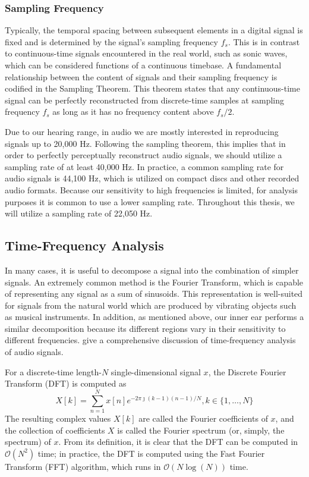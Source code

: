 \subsubsection{Sampling Frequency}

Typically, the temporal spacing between subsequent elements in a digital signal is fixed and is determined by the signal's sampling frequency $f_s$.
This is in contrast to continuous-time signals encountered in the real world, such as sonic waves, which can be considered functions of a continuous timebase.
A fundamental relationship between the content of signals and their sampling frequency is codified in the Sampling Theorem.
This theorem states that any continuous-time signal can be perfectly reconstructed from discrete-time samples at sampling frequency $f_s$ as long as it has no frequency content above $f_s/2$.

Due to our hearing range, in audio we are mostly interested in reproducing signals up to 20,000 Hz.
Following the sampling theorem, this implies that in order to perfectly perceptually reconstruct audio signals, we should utilize a sampling rate of at least 40,000 Hz.
In practice, a common sampling rate for audio signals is 44,100 Hz, which is utilized on compact discs and other recorded audio formats.
Because our sensitivity to high frequencies is limited, for analysis purposes it is common to use a lower sampling rate.
Throughout this thesis, we will utilize a sampling rate of 22,050 Hz.

\subsection{Time-Frequency Analysis}

In many cases, it is useful to decompose a signal into the combination of simpler signals.
An extremely common method is the Fourier Transform, which is capable of representing any signal as a sum of sinusoids.
This representation is well-suited for signals from the natural world which are produced by vibrating objects such as musical instruments.
In addition, as mentioned above, our inner ear performs a similar decomposition because its different regions vary in their sensitivity to different frequencies.
\cite{smith2011spectral,smith2007mathematics} give a comprehensive discussion of time-frequency analysis of audio signals.

For a discrete-time length-$N$ single-dimensional signal $x$, the Discrete Fourier Transform (DFT) is computed as
\begin{equation}
        X[k] = \sum_{n = 1}^N x[n] e^{-2\pi \jmath (k - 1)(n - 1)/N}, k \in \{1, \ldots, N\}
\end{equation}
The resulting complex values $X[k]$ are called the Fourier coefficients of $x$, and the collection of coefficients $X$ is called the Fourier spectrum (or, simply, the spectrum) of $x$.
From its definition, it is clear that the DFT can be computed in $\mathcal{O}(N^2)$ time; in practice, the DFT is computed using the Fast Fourier Transform (FFT) algorithm, which runs in $\mathcal{O}(N \log(N))$ time.

